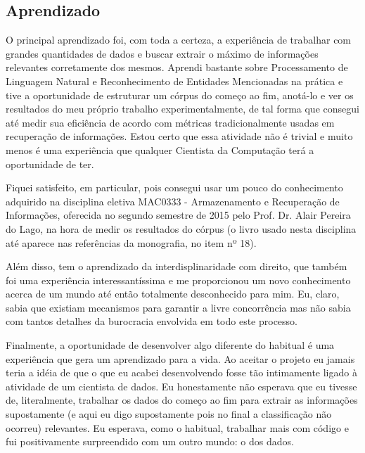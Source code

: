 \documentclass[11pt]{report}
\begin{document}
\subsection*{Aprendizado}

\indent\indent O principal aprendizado foi, com toda a certeza, a experiência de trabalhar com grandes quantidades de dados e buscar extrair o máximo de informações
relevantes corretamente dos mesmos. Aprendi bastante sobre Processamento de Linguagem Natural e Reconhecimento de Entidades Mencionadas na prática e tive a oportunidade
de estruturar um córpus do começo ao fim, anotá-lo e ver os resultados do meu próprio trabalho experimentalmente, de tal forma que consegui até medir sua eficiência de
acordo com métricas tradicionalmente usadas em recuperação de informações. Estou certo que essa atividade não é trivial e muito menos é uma experiência que qualquer
Cientista da Computação terá a oportunidade de ter.

Fiquei satisfeito, em particular, pois consegui usar um pouco do conhecimento adquirido na disciplina eletiva MAC0333 - Armazenamento e Recuperação de Informações, oferecida no
segundo semestre de 2015 pelo Prof. Dr. Alair Pereira do Lago, na hora de medir os resultados do córpus (o livro usado nesta disciplina até aparece nas referências da
monografia, no item nº 18).

Além disso, tem o aprendizado da interdisplinaridade com direito, que também foi uma experiência interessantíssima e me proporcionou um novo conhecimento acerca de um mundo até então
totalmente desconhecido para mim. Eu, claro, sabia que existiam mecanismos para garantir a livre concorrência mas não sabia com tantos detalhes da burocracia envolvida
em todo este processo.

Finalmente, a oportunidade de desenvolver algo diferente do habitual é uma experiência que gera um aprendizado para a vida. Ao aceitar o projeto eu jamais teria a idéia
de que o que eu acabei desenvolvendo fosse tão intimamente ligado à atividade de um cientista de dados. Eu honestamente não esperava que eu tivesse de, literalmente,
trabalhar os dados do começo ao fim para extrair as informações supostamente (e aqui eu digo supostamente pois no final a classificação não ocorreu) relevantes. Eu esperava,
como o habitual, trabalhar mais com código e fui positivamente surpreendido com um outro mundo: o dos dados.
\end{document}
